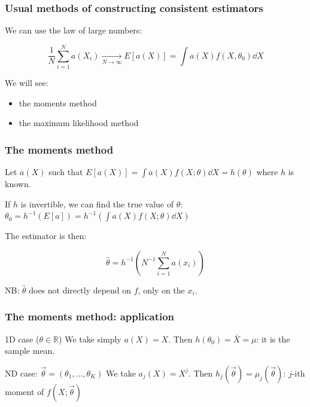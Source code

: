 \documentclass[9pt]{beamer}
\begin{document}
\begin{frame}
 \frametitle{Usual methods of constructing consistent estimators}
 
 We can use the law of large numbers:
 
 $$\frac{1}{N} \sum_{i=1}^N a(X_i) \xrightarrow[N\to\infty]{} E[a(X)] = \int a(X)f(X,\theta_0)\dd X$$
 
 We will see:
 
 \begin{itemize}
  \item the moments method
  \item the maximum likelihood method
 \end{itemize}

 
\end{frame}


\begin{frame}
 \frametitle{The moments method}
 
 Let $a(X)$ such that $E[a(X)] = \int a(X) f(X;\theta) \dd X = h(\theta)$ where $h$ is known. 
 
 If $h$ is invertible, we can find the true value of $\theta$: 
 $\theta_0 = h^{-1}(E[a]) = h^{-1}\left(\int a(X) f(X;\theta) \dd X\right)$
 
 The estimator is then:
 
 $$\hat{\theta} = h^{-1} \left( N^{-1} \sum_{i=1}^N a(x_i) \right)$$
 
 NB: $\hat{\theta}$ does not directly depend on $f$, only on the $x_i$.
\end{frame}

\begin{frame}
 \frametitle{The moments method: application}
 
 \begin{block}{1D case ($\theta \in \mathbb{R}$)}
  We take simply $a(X) = X$. Then $h(\theta_0) = \bar{X} = \mu$: it is the sample mean.
 \end{block}
 
 \begin{block}{ND case: $\vec{\theta} = (\theta_1,\dots,\theta_K)$}
  We take $a_j(X) = X^j$. Then $h_j(\vec{\theta}) = \mu_j(\vec{\theta})$: $j$-ith moment of $f(X;\vec{\theta})$
 \end{block}


\end{frame}
\end{document}
